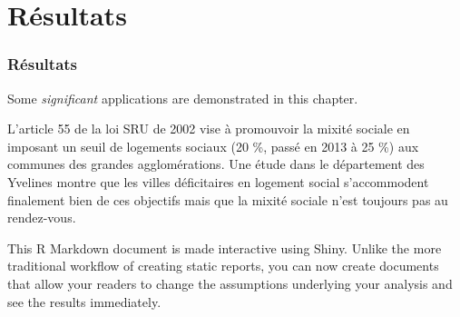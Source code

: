 \documentclass[
  french,
]{article}
\newenvironment{Shaded}{\begin{snugshade}}{\end{snugshade}}
\newcommand{\CommentTok}[1]{\textcolor[rgb]{0.56,0.35,0.01}{\textit{#1}}}
\newcommand{\DataTypeTok}[1]{\textcolor[rgb]{0.13,0.29,0.53}{#1}}
\newcommand{\DecValTok}[1]{\textcolor[rgb]{0.00,0.00,0.81}{#1}}
\newcommand{\KeywordTok}[1]{\textcolor[rgb]{0.13,0.29,0.53}{\textbf{#1}}}
\newcommand{\NormalTok}[1]{#1}
\newcommand{\OperatorTok}[1]{\textcolor[rgb]{0.81,0.36,0.00}{\textbf{#1}}}
\newcommand{\StringTok}[1]{\textcolor[rgb]{0.31,0.60,0.02}{#1}}
\begin{document}
\hypertarget{part-ruxe9sultats}{%
\part{Résultats}\label{part-ruxe9sultats}}

\hypertarget{ruxe9sultats}{%
\section{Résultats}\label{ruxe9sultats}}

Some \emph{significant} applications are demonstrated in this chapter.

L'article 55 de la loi SRU de 2002 vise à promouvoir la mixité sociale en imposant un seuil de logements sociaux (20 \%, passé en 2013 à 25 \%) aux communes des grandes agglomérations. Une étude dans le département des Yvelines montre que les villes déficitaires en logement social s'accommodent finalement bien de ces objectifs mais que la mixité sociale n'est toujours pas au rendez-vous.

\begin{Shaded}
\end{Shaded}

This R Markdown document is made interactive using Shiny. Unlike the more traditional workflow of creating static reports, you can now create documents that allow your readers to change the assumptions underlying your analysis and see the results immediately.
\end{document}
